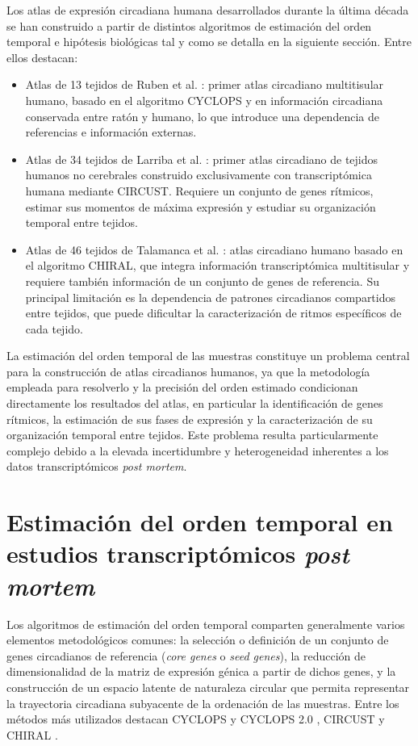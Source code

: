 \documentclass[12pt, a4paper]{report}
\begin{document}
Los atlas de expresión circadiana humana desarrollados durante la última década se han construido a partir de distintos algoritmos de estimación del orden temporal e hipótesis biológicas tal y como se detalla en la siguiente sección. Entre ellos destacan:
\begin{itemize}
    \item Atlas de 13 tejidos de Ruben et al. \cite{ruben2018}: primer atlas circadiano multitisular humano, basado en el algoritmo CYCLOPS y en información circadiana conservada entre ratón y humano, lo que introduce una dependencia de referencias e información externas.
    \item Atlas de 34 tejidos de Larriba et al. \cite{larriba2023}: primer atlas circadiano de tejidos humanos no cerebrales construido exclusivamente con transcriptómica humana mediante CIRCUST. Requiere un conjunto de genes rítmicos, estimar sus momentos de máxima expresión y estudiar su organización temporal entre tejidos.
    \item Atlas de 46 tejidos de Talamanca et al. \cite{talamanca2023}: atlas circadiano humano basado en el algoritmo CHIRAL, que integra información transcriptómica multitisular y requiere también información de un conjunto de genes de referencia. Su principal limitación es la dependencia de patrones circadianos compartidos entre tejidos, que puede dificultar la caracterización de ritmos específicos de cada tejido.
    \end{itemize}

La estimación del orden temporal de las muestras constituye un problema central para la construcción de atlas circadianos humanos, ya que la metodología empleada para resolverlo y la precisión del orden estimado condicionan directamente los resultados del atlas, en particular la identificación de genes rítmicos, la estimación de sus fases de expresión y la caracterización de su organización temporal entre tejidos. Este problema resulta particularmente complejo debido a la elevada incertidumbre y heterogeneidad inherentes a los datos transcriptómicos \textit{post mortem}.

\section{Estimación del orden temporal en estudios transcriptómicos \textit{post mortem}}
\label{sec:estimacionOrdenIntro}

Los algoritmos de estimación del orden temporal comparten generalmente varios elementos metodológicos comunes: la selección o definición de un conjunto de genes circadianos de referencia (\textit{core genes} o \textit{seed genes}), la reducción de dimensionalidad de la matriz de expresión génica a partir de dichos genes, y la construcción de un espacio latente de naturaleza circular que permita representar la trayectoria circadiana subyacente de la ordenación de las muestras. Entre los métodos más utilizados destacan CYCLOPS \cite{CYCLOPS} y CYCLOPS 2.0 \cite{CYCLOPS2}, CIRCUST \cite{larriba2023} y CHIRAL \cite{talamanca2023}.
\end{document}

